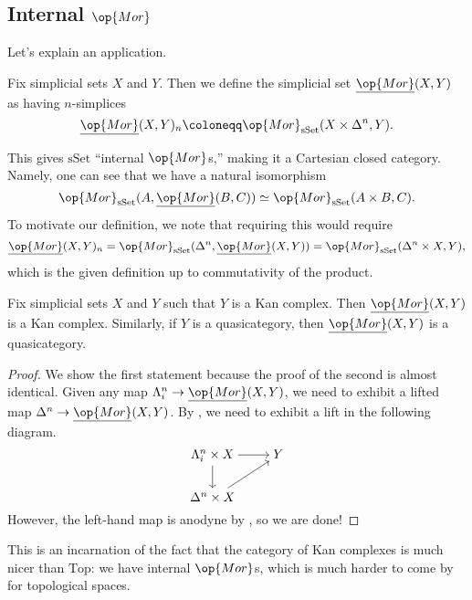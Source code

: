 \documentclass[../notes.tex]{subfiles}
\begin{document}
\subsection{Internal \texorpdfstring{$\op{Mor}$}{ Mor}}
Let's explain an application.
\begin{definition}
	Fix simplicial sets $X$ and $Y$. Then we define the simplicial set $\underline{\op{Mor}}(X,Y)$ as having $n$-simplices
	\[\underline{\op{Mor}}(X,Y)_n\coloneqq\op{Mor}_{\mathrm{sSet}}(X\times\Delta^n,Y).\]
\end{definition}
\begin{remark} \label{rem:curry}
	This gives $\mathrm{sSet}$ ``internal $\op{Mor}$s,'' making it a Cartesian closed category. Namely, one can see that we have a natural isomorphism
	\[\op{Mor}_{\mathrm{sSet}}(A,\underline{\op{Mor}}(B,C))\simeq\op{Mor}_{\mathrm{sSet}}(A\times B,C).\]
	To motivate our definition, we note that requiring this would require
	\[\underline{\op{Mor}}(X,Y)_n=\op{Mor}_{\mathrm{sSet}}(\Delta^n,\underline{\op{Mor}}(X,Y))=\op{Mor}_{\mathrm{sSet}}(\Delta^n\times X,Y),\]
	which is the given definition up to commutativity of the product.
\end{remark}
\begin{proposition}
	Fix simplicial sets $X$ and $Y$ such that $Y$ is a Kan complex. Then $\underline{\op{Mor}}(X,Y)$ is a Kan complex. Similarly, if $Y$ is a quasicategory, then $\underline{\op{Mor}}(X,Y)$ is a quasicategory.
\end{proposition}
\begin{proof}
	We show the first statement because the proof of the second is almost identical. Given any map $\Lambda^n_i\to\underline{\op{Mor}}(X,Y)$, we need to exhibit a lifted map $\Delta^n\to\underline{\op{Mor}}(X,Y)$. By , we need to exhibit a lift in the following diagram.
	\[\begin{tikzcd}[cramped]
		{\Lambda_i^n\times X} & Y \\
		{\Delta^n\times X}
		\arrow[from=1-1, to=1-2]
		\arrow[from=1-1, to=2-1]
		\arrow[from=2-1, to=1-2]
	\end{tikzcd}\]
	However, the left-hand map is anodyne by , so we are done!
\end{proof}
\begin{remark}
	This is an incarnation of the fact that the category of Kan complexes is much nicer than $\mathrm{Top}$: we have internal $\op{Mor}$s, which is much harder to come by for topological spaces.
\end{remark}
\end{document}
